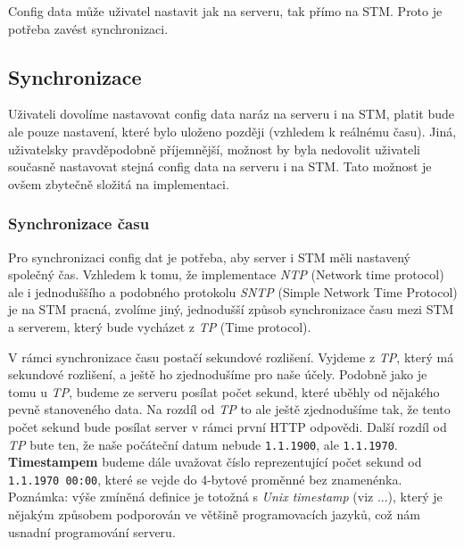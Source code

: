 
Config data může uživatel nastavit jak na serveru, tak přímo na STM.
Proto je potřeba zavést synchronizaci.

\subsection{Synchronizace}

Uživateli dovolíme nastavovat config data naráz na serveru i na STM, platit bude ale pouze
nastavení, které bylo uloženo později (vzhledem k reálnému času).
Jiná, uživatelsky pravděpodobně příjemnější, možnost by byla nedovolit uživateli současně
nastavovat stejná config data na serveru i na STM.
Tato možnost je ovšem zbytečně složitá na implementaci.

\subsubsection{Synchronizace času}

Pro synchronizaci config dat je potřeba, aby server i STM měli nastavený společný čas.
Vzhledem k tomu, že implementace \emph{NTP} (Network time protocol) ale i jednoduššího a podobného
protokolu \emph{SNTP} (Simple Network Time Protocol) je na STM pracná, zvolíme jiný, jednodušší způsob synchronizace
času mezi STM a serverem, který bude vycházet z \emph{TP} (Time protocol).

V rámci synchronizace času postačí sekundové rozlišení.
Vyjdeme z \emph{TP}, který má sekundové rozlišení, a ještě ho zjednodušíme pro naše účely.
Podobně jako je tomu u \emph{TP}, budeme ze serveru posílat počet sekund, které
uběhly od nějakého pevně stanoveného data.
Na rozdíl od \emph{TP} to ale ještě zjednodušíme tak, že tento počet sekund bude posílat server
v rámci první HTTP odpovědi.
Další rozdíl od \emph{TP} bute ten, že naše počáteční datum nebude \texttt{1.1.1900}, ale \texttt{1.1.1970}.
\textbf{Timestampem} budeme dále uvažovat číslo reprezentující počet sekund od \texttt{1.1.1970 00:00},
které se vejde do 4-bytové proměnné bez znamenénka.
Poznámka: výše zmíněná definice je totožná s \emph{Unix timestamp} (viz ...), který je nějakým způsobem
podporován ve většině programovacích jazyků, což nám usnadní programování serveru.

